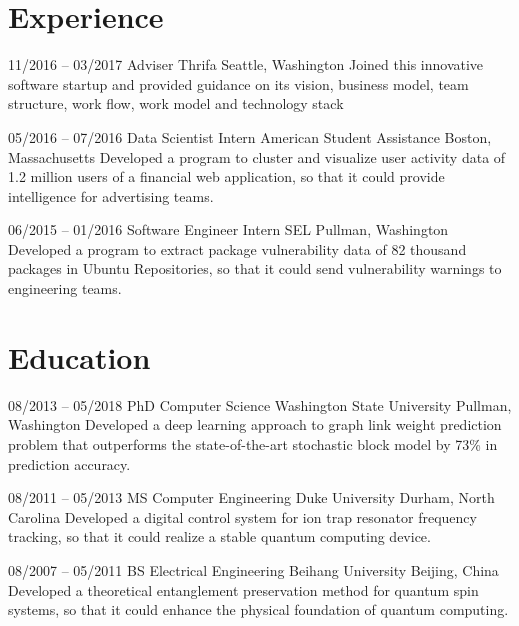 \documentclass{moderncv}
\begin{document}
\makecvtitle

\section{Experience}

\cventry
{11/2016 -- 03/2017}
{Adviser}
{Thrifa}
{Seattle, Washington}
{}
{Joined this innovative software startup and provided guidance on its vision, business model, team structure, work flow, work model and technology stack}

\cventry
{05/2016 -- 07/2016}
{Data Scientist Intern}
{American Student Assistance}
{Boston, Massachusetts}
{}
{Developed a program to cluster and visualize user activity data of 1.2 million users of a financial web application, so that it could provide intelligence for advertising teams.}

\cventry
{06/2015 -- 01/2016}
{Software Engineer Intern}
{SEL}
{Pullman, Washington}
{}
{Developed a program to extract package vulnerability data of 82 thousand packages in Ubuntu Repositories, so that it could send vulnerability warnings to engineering teams.}

\section{Education}

\cventry
{08/2013 -- 05/2018}
{PhD}
{Computer Science}
{Washington State University}
{Pullman, Washington}
{Developed a deep learning approach to graph link weight prediction problem that outperforms the state-of-the-art stochastic block model by 73\% in prediction accuracy.}

\cventry
{08/2011 -- 05/2013}
{MS}
{Computer Engineering}
{Duke University}
{Durham, North Carolina}
{Developed a digital control system for ion trap resonator frequency tracking, so that it could realize a stable quantum computing device.}

\cventry
{08/2007 -- 05/2011}
{BS}
{Electrical Engineering}
{Beihang University}
{Beijing, China}
{Developed a theoretical entanglement preservation method for quantum spin systems, so that it could enhance the physical foundation of quantum computing.}
\end{document}

